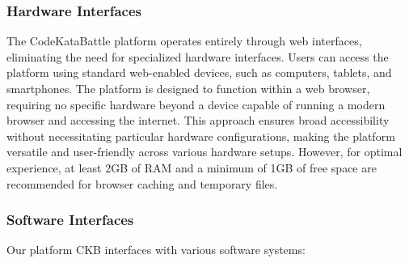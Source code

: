 \newpage
    
\subsubsection{Hardware Interfaces}
The CodeKataBattle platform operates entirely through web interfaces, eliminating the need for specialized hardware interfaces. Users can access the platform using standard web-enabled devices, such as computers, tablets, and smartphones. The platform is designed to function within a web browser, requiring no specific hardware beyond a device capable of running a modern browser and accessing the internet. This approach ensures broad accessibility without necessitating particular hardware configurations, making the platform versatile and user-friendly across various hardware setups. However, for optimal experience, at least 2GB of RAM and a minimum of 1GB of free space are recommended for browser caching and temporary files.

\subsubsection{Software Interfaces}
Our platform CKB interfaces with various software systems:

